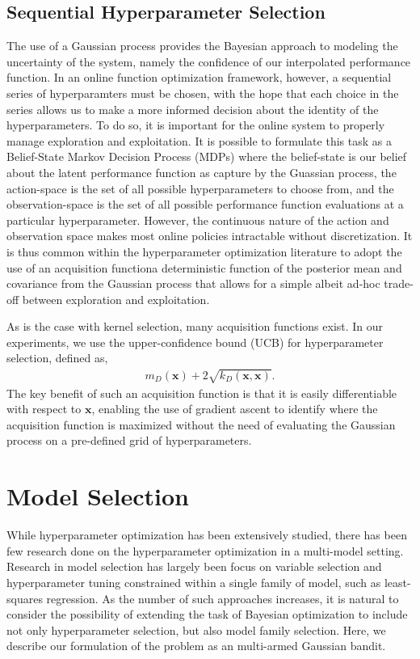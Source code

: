 \documentclass{article}
\newcommand{\x}{\mathbf{x}}
\begin{document}
\subsection{Sequential Hyperparameter Selection}
The use of a Gaussian process provides the Bayesian approach to modeling the uncertainty of the system, namely the confidence of our interpolated performance function. In an online function optimization framework, however, a sequential series of hyperparamters must be chosen, with the hope that each choice in the series allows us to make a more informed decision about the identity of the hyperparameters. To do so, it is important for the online system to properly manage exploration and exploitation. It is possible to formulate this task as a Belief-State Markov Decision Process (MDPs) where the belief-state is our belief about the latent performance function as capture by the Guassian process, the action-space is the set of all possible hyperparameters to choose from, and the observation-space is the set of all possible performance function evaluations at a particular hyperparameter. However, the continuous nature of the action and observation space makes most online policies intractable without discretization. It is thus common within the hyperparameter optimization literature to adopt the use of an acquisition function\textemdash a deterministic function of the posterior mean and covariance from the Gaussian process that allows for a simple albeit ad-hoc trade-off between exploration and exploitation. 

As is the case with kernel selection, many acquisition functions exist. In our experiments, we use the upper-confidence bound (UCB) for hyperparameter selection, defined as,
\begin{align}
  m_D(\x) + 2\sqrt{k_D(\x, \x)}.
\end{align}
The key benefit of such an acquisition function is that it is easily differentiable with respect to $\x$, enabling the use of gradient ascent to identify where the acquisition function is maximized without the need of evaluating the Gaussian process on a pre-defined grid of hyperparameters. 

\section{Model Selection}
While hyperparameter optimization has been extensively studied, there has been few research done on the hyperparameter optimization in a multi-model setting. Research in model selection has largely been focus on variable selection and hyperparameter tuning constrained within a single family of model, such as least-squares regression. As the number of such approaches increases, it is natural to consider the possibility of extending the task of Bayesian optimization to include not only hyperparameter selection, but also model family selection. Here, we describe our formulation of the problem as an multi-armed Gaussian bandit. 
\end{document}
